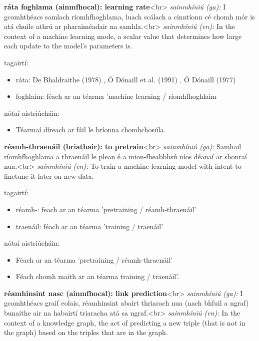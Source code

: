 \documentclass{article}
\begin{document}
\textbf{ráta foghlama (ainmfhocal): learning rate}<br>
\textit{sainmhíniú (ga):} I gcomhthéacs samlach ríomhfhoghlama, luach scálach a cinntíonn cé chomh mór is atá chuile athrú ar pharaiméadair na samhla.<br>
\textit{sainmhíniú (en):} In the context of a machine learning mode, a scalar value that determines how large each update to the model's parameters is.

tagairtí:
\begin{itemize}
	\item ráta: De Bhaldraithe (1978) \cite{de-bhaldraithe}, Ó Dónaill et al. (1991) \cite{focloir-beag}, Ó Dónaill (1977) \cite{odonaill}
	\item foghlaim: féach ar an téarma 'machine learning / ríomhfhoghlaim
\end{itemize}

nótaí aistriúcháin:
\begin{itemize}
	\item Téarmaí díreach ar fáil le bríonna chomhchosúla.
\end{itemize}


\textbf{réamh-thraenáil (briathair): to pretrain}<br>
\textit{sainmhíniú (ga):} Samhail ríomhfhoghlama a thraenáil le plean é a mion-fheabbhsú níos déanaí ar shonraí nua.<br>
\textit{sainmhíniú (en):} To train a machine learning model with intent to finetune it later on new data.

tagairtí:
\begin{itemize}
	\item réamh-: feach ar an téarma 'pretraining / réamh-thraenáil'
	\item traenáil: féach ar an téarma 'training / traenáil'
\end{itemize}

nótaí aistriúcháin:
\begin{itemize}
	\item Féach ar an téarma 'pretraining / réamh-thraenáil'
	\item Féach chomh maith ar an téarma training / traenáil'.
\end{itemize}


\textbf{réamhinsint nasc (ainmfhocal): link prediction}<br>
\textit{sainmhíniú (ga):} I gcomhthéacs graif eolais, réamhinsint abairt thriarach nua (nach bhfuil a ngraf) bunaithe air na habairtí triaracha atá sa ngraf.<br>
\textit{sainmhíniú (en):} In the context of a knowledge graph, the act of predicting a new triple (that is not in the graph) based on the triples that are in the graph.
\end{document}
